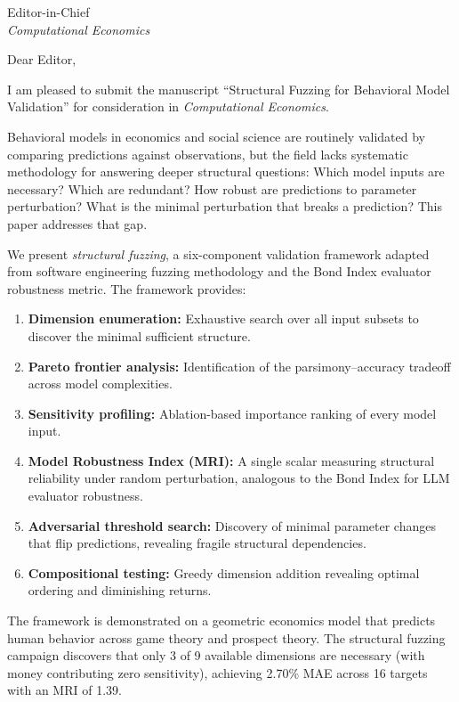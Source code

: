 \documentclass[12pt]{letter}
\begin{document}
\begin{letter}{%
Editor-in-Chief\\
\emph{Computational Economics}}

\opening{Dear Editor,}

I am pleased to submit the manuscript ``Structural Fuzzing for Behavioral Model Validation'' for consideration in \emph{Computational Economics}.

Behavioral models in economics and social science are routinely validated by comparing predictions against observations, but the field lacks systematic methodology for answering deeper structural questions: Which model inputs are necessary?  Which are redundant?  How robust are predictions to parameter perturbation?  What is the minimal perturbation that breaks a prediction?  This paper addresses that gap.

We present \emph{structural fuzzing}, a six-component validation framework adapted from software engineering fuzzing methodology and the Bond Index evaluator robustness metric.  The framework provides:
\begin{enumerate}
    \item \textbf{Dimension enumeration:} Exhaustive search over all input subsets to discover the minimal sufficient structure.
    \item \textbf{Pareto frontier analysis:} Identification of the parsimony--accuracy tradeoff across model complexities.
    \item \textbf{Sensitivity profiling:} Ablation-based importance ranking of every model input.
    \item \textbf{Model Robustness Index (MRI):} A single scalar measuring structural reliability under random perturbation, analogous to the Bond Index for LLM evaluator robustness.
    \item \textbf{Adversarial threshold search:} Discovery of minimal parameter changes that flip predictions, revealing fragile structural dependencies.
    \item \textbf{Compositional testing:} Greedy dimension addition revealing optimal ordering and diminishing returns.
\end{enumerate}

The framework is demonstrated on a geometric economics model that predicts human behavior across game theory and prospect theory.  The structural fuzzing campaign discovers that only 3 of 9 available dimensions are necessary (with money contributing zero sensitivity), achieving 2.70\% MAE across 16 targets with an MRI of 1.39.


\end{letter}
\end{document}
